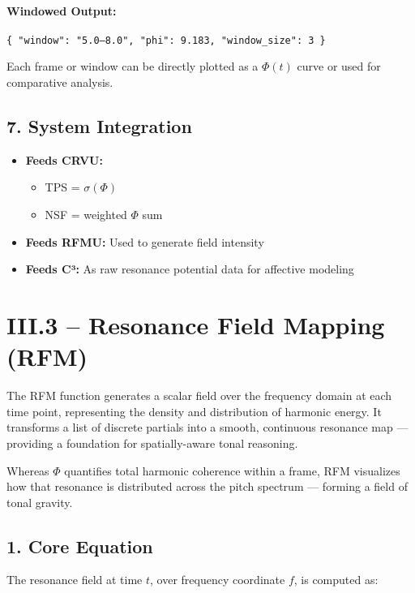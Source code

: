 \documentclass{article}
\begin{document}
\paragraph{Windowed Output:}

\begin{verbatim}
{ "window": "5.0–8.0", "phi": 9.183, "window_size": 3 }
\end{verbatim}

Each frame or window can be directly plotted as a $\Phi(t)$ curve or used for comparative analysis.

\subsection*{7. System Integration}

\begin{itemize}
    \item \textbf{Feeds CRVU:}
    \begin{itemize}
        \item TPS = $\sigma(\Phi)$
        \item NSF = weighted $\Phi$ sum
    \end{itemize}
    \item \textbf{Feeds RFMU:} Used to generate field intensity
    \item \textbf{Feeds C³:} As raw resonance potential data for affective modeling
\end{itemize}

\section*{III.3 – Resonance Field Mapping (RFM)}

The RFM function generates a scalar field over the frequency domain at each time point, representing the density and distribution of harmonic energy. It transforms a list of discrete partials into a smooth, continuous resonance map — providing a foundation for spatially-aware tonal reasoning.

Whereas $\Phi$ quantifies total harmonic coherence within a frame, RFM visualizes how that resonance is distributed across the pitch spectrum — forming a field of tonal gravity.

\subsection*{1. Core Equation}

The resonance field at time $t$, over frequency coordinate $f$, is computed as:
\end{document}
